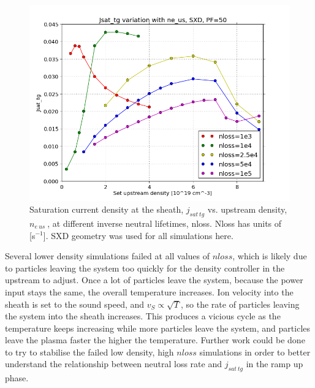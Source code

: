 \documentclass[12pt]{article}  %
\providecommand{\pow}[1]{{$^{#1}$}} %
\providecommand{\neus}{$n_{e~us}~$} %
\begin{document}
\begin{figure}
\includegraphics[scale=0.5]{Figures/sol1d/nloss1e345,525e425_2.png}
\centering
\caption{Saturation current density at the sheath, $j_{sat~tg}$ vs. upstream density, \neus, at different inverse neutral lifetimes, nloss. Nloss has units of [s\pow{-1}]. SXD geometry was used for all simulations here.}\label{fignloss1e345,52.5e425_2}
\end{figure}

Several lower density simulations failed at all values of $nloss$, which is likely due to particles leaving the system too quickly for the density controller in the upstream to adjust. Once a lot of particles leave the system, because the power input stays the same, the overall temperature increases. Ion velocity into the sheath is set to the sound speed, and $v_S \propto \sqrt{T}$, so the rate of particles leaving the system into the sheath increases. This produces a vicious cycle as the temperature keeps increasing while more particles leave the system, and particles leave the plasma faster the higher the temperature. Further work could be done to try to stabilise the failed low density, high $nloss$ simulations in order to better understand the relationship between neutral loss rate and $j_{sat~tg}$ in the ramp up phase.
\end{document}
